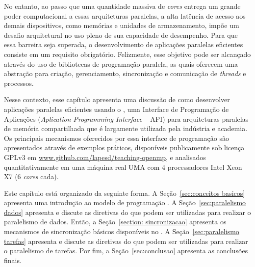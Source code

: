 \documentclass{SBCbookchapter}
\begin{document}
	No entanto, ao passo que uma quantidade massiva de \textit{cores}
	entrega um grande poder computacional a essas arquiteturas
	paralelas, a alta latência de acesso aos demais dispositivos, como
	memórias e unidades de armazenamento, impõe um desafio arquitetural
	no uso pleno de sua capacidade de desempenho. Para que essa barreira
	seja superada, o desenvolvimento de aplicações paralelas eficientes
	consiste em um requisito obrigatório. Felizmente, esse objetivo pode ser
	alcançado através do uso de bibliotecas de programação paralela, as
	quais oferecem uma abstração para criação, gerenciamento,
	sincronização e comunicação de \textit{threads} e processos.
	
	Nesse contexto, esse capítulo apresenta uma discussão de como
	desenvolver aplicações paralelas eficientes usando o \openmp, uma
	Interface de Programação de Aplicações (\textit{Aplication Programming
	Interface} -- API) para arquiteturas paralelas de memória compartilhada
	que é largamente utilizada pela indústria e academia. Os principais
	mecanismos oferecidos por essa interface de programação são apresentados
	através de exemplos práticos, disponíveis publicamente sob licença
	GPLv3 em \url{www.github.com/lapesd/teaching-openmp}, e analisados
	quantitativamente em uma máquina real UMA com 4 processadores Intel Xeon
	X7 (6 \textit{cores} cada).
	
	Este capítulo está organizado da seguinte forma. A
	Seção~\ref{sec:conceitos basicos} apresenta uma introdução ao modelo
	de programação \openmp.  A Seção~\ref{sec:paralelismo dados}
	apresenta e discute as diretivas do \openmp que podem ser utilizadas
	para realizar o paralelismo de dados. Então, a Seção~\ref{section:
	sincronizacao} apresenta os mecanismos de sincronização básicos
	disponíveis no \openmp. A Seção~\ref{sec:paralelismo tarefas}
	apresenta e discute as diretivas do \openmp que podem ser utilizadas
	para realizar o paralelismo de tarefas. Por fim, a Seção~\ref{sec:conclusao}
	apresenta as conclusões finais.
\end{document}
